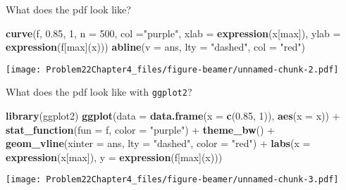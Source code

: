 \documentclass[ignorenonframetext,]{beamer}
\makeatletter
\newenvironment{Shaded}{\begin{snugshade}}{\end{snugshade}}
\newcommand{\KeywordTok}[1]{\textcolor[rgb]{0.13,0.29,0.53}{\textbf{{#1}}}}
\newcommand{\DataTypeTok}[1]{\textcolor[rgb]{0.13,0.29,0.53}{{#1}}}
\newcommand{\DecValTok}[1]{\textcolor[rgb]{0.00,0.00,0.81}{{#1}}}
\newcommand{\FloatTok}[1]{\textcolor[rgb]{0.00,0.00,0.81}{{#1}}}
\newcommand{\StringTok}[1]{\textcolor[rgb]{0.31,0.60,0.02}{{#1}}}
\newcommand{\NormalTok}[1]{{#1}}
\def\ScaleIfNeeded{%
  \ifdim\Gin@nat@width>\linewidth
    \linewidth
  \else
    \Gin@nat@width
  \fi
}
\let\Oldincludegraphics\includegraphics
\renewcommand{\includegraphics}[2][]{\Oldincludegraphics[width=\ScaleIfNeeded]{#2}}
\makeatother
\begin{document}
\begin{frame}[fragile]{What does the pdf look like?}

\begin{Shaded}
\begin{Highlighting}[]
\KeywordTok{curve}\NormalTok{(f, }\FloatTok{0.85}\NormalTok{, }\DecValTok{1}\NormalTok{, }\DataTypeTok{n =} \DecValTok{500}\NormalTok{, }\DataTypeTok{col =}\StringTok{"purple"}\NormalTok{, }
      \DataTypeTok{xlab =} \KeywordTok{expression}\NormalTok{(x[max]), }
      \DataTypeTok{ylab =} \KeywordTok{expression}\NormalTok{(f[max](x)))}
\KeywordTok{abline}\NormalTok{(}\DataTypeTok{v =} \NormalTok{ans, }\DataTypeTok{lty =} \StringTok{"dashed"}\NormalTok{, }\DataTypeTok{col =} \StringTok{"red"}\NormalTok{)}
\end{Highlighting}
\end{Shaded}

\texttt{[image: Problem22Chapter4\_files/figure-beamer/unnamed-chunk-2.pdf]}

\end{frame}

\begin{frame}[fragile]{What does the pdf look like with
\texttt{ggplot2}?}

\begin{Shaded}
\begin{Highlighting}[]
\KeywordTok{library}\NormalTok{(ggplot2)}
\KeywordTok{ggplot}\NormalTok{(}\DataTypeTok{data =} \KeywordTok{data.frame}\NormalTok{(}\DataTypeTok{x =} \KeywordTok{c}\NormalTok{(}\FloatTok{0.85}\NormalTok{, }\DecValTok{1}\NormalTok{)), }\KeywordTok{aes}\NormalTok{(}\DataTypeTok{x =} \NormalTok{x)) +}\StringTok{ }
\StringTok{  }\KeywordTok{stat_function}\NormalTok{(}\DataTypeTok{fun =} \NormalTok{f, }\DataTypeTok{color =} \StringTok{"purple"}\NormalTok{) +}\StringTok{ }
\StringTok{  }\KeywordTok{theme_bw}\NormalTok{() +}
\StringTok{  }\KeywordTok{geom_vline}\NormalTok{(}\DataTypeTok{xinter =} \NormalTok{ans, }\DataTypeTok{lty =} \StringTok{"dashed"}\NormalTok{, }\DataTypeTok{color =} \StringTok{"red"}\NormalTok{) +}\StringTok{ }
\StringTok{  }\KeywordTok{labs}\NormalTok{(}\DataTypeTok{x =} \KeywordTok{expression}\NormalTok{(x[max]), }\DataTypeTok{y =} \KeywordTok{expression}\NormalTok{(f[max](x)))}
\end{Highlighting}
\end{Shaded}

\texttt{[image: Problem22Chapter4\_files/figure-beamer/unnamed-chunk-3.pdf]}

\end{frame}
\end{document}
